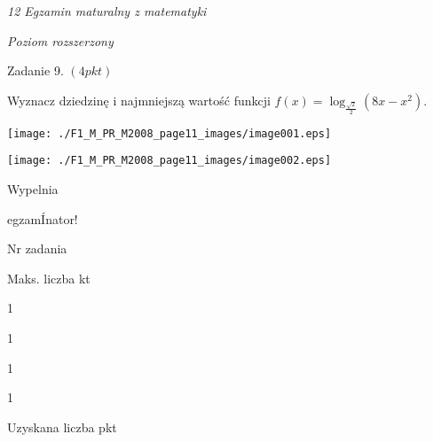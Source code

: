 \documentclass[a4paper,12pt]{article}
\begin{document}
{\it 12 Egzamin maturalny z matematyki}

{\it Poziom rozszerzony}

Zadanie 9. $(4pkt)$

Wyznacz dziedzinę i najmniejszą wartość funkcji $f(x)=\log_{\frac{\sqrt{2}}{2}}(8x-x^{2}).$
\begin{center}
\texttt{[image: ./F1\_M\_PR\_M2008\_page11\_images/image001.eps]}

\texttt{[image: ./F1\_M\_PR\_M2008\_page11\_images/image002.eps]}
\end{center}
Wypelnia

egzamÍnator!

Nr zadania

Maks. liczba kt

1

1

1

1

Uzyskana liczba pkt
\end{document}
